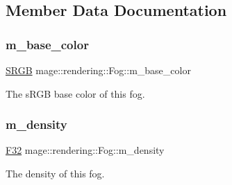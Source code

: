 \subsection{Member Data Documentation}
\hypertarget{classmage_1_1rendering_1_1_fog_af832a6c451bd2f3c9976f3f137a70c9d}{}\label{classmage_1_1rendering_1_1_fog_af832a6c451bd2f3c9976f3f137a70c9d} 
\subsubsection{\texorpdfstring{m\+\_\+base\+\_\+color}{m\_base\_color}}
{\footnotesize\ttfamily \hyperlink{structmage_1_1_s_r_g_b}{S\+R\+GB} mage\+::rendering\+::\+Fog\+::m\+\_\+base\+\_\+color\hspace{0.3cm}{\ttfamily [private]}}

The s\+R\+GB base color of this fog. \hypertarget{classmage_1_1rendering_1_1_fog_aa7a402ad9eef0e9916bb9f83751ebe32}{}\label{classmage_1_1rendering_1_1_fog_aa7a402ad9eef0e9916bb9f83751ebe32} 
\subsubsection{\texorpdfstring{m\+\_\+density}{m\_density}}
{\footnotesize\ttfamily \hyperlink{namespacemage_aa97e833b45f06d60a0a9c4fc22ae02c0}{F32} mage\+::rendering\+::\+Fog\+::m\+\_\+density\hspace{0.3cm}{\ttfamily [private]}}

The density of this fog. 
